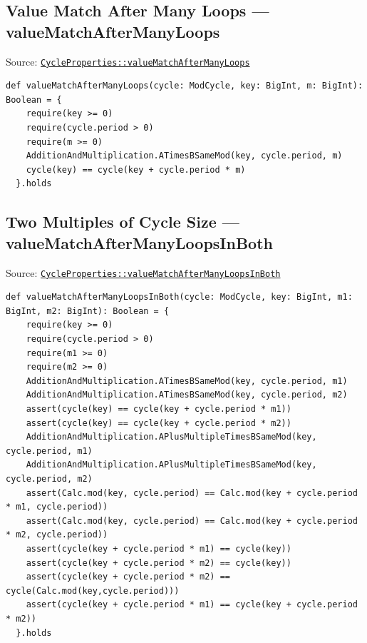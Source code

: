 \subsection{Value Match After Many Loops --- valueMatchAfterManyLoops}

Source:
\href{https://github.com/thiagomata/prime-numbers/blob/cycle-article-v1.0.0/src/main/scala/v1/chapter4/cycle/properties/CycleProperties.scala}{\texttt{CycleProperties::valueMatchAfterManyLoops}}

\begin{lstlisting}[style=scala]
  def valueMatchAfterManyLoops(cycle: ModCycle, key: BigInt, m: BigInt): Boolean = {
    require(key >= 0)
    require(cycle.period > 0)
    require(m >= 0)
    AdditionAndMultiplication.ATimesBSameMod(key, cycle.period, m)
    cycle(key) == cycle(key + cycle.period * m)
  }.holds
\end{lstlisting}

\subsection{Two Multiples of Cycle Size --- valueMatchAfterManyLoopsInBoth}

{\raggedright
Source:
\href{https://github.com/thiagomata/prime-numbers/blob/cycle-article-v1.0.0/src/main/scala/v1/chapter4/cycle/properties/CycleProperties.scala}{\texttt{CycleProperties::\allowbreak valueMatchAfterManyLoopsInBoth}}
\par}

\begin{lstlisting}[style=scala]
  def valueMatchAfterManyLoopsInBoth(cycle: ModCycle, key: BigInt, m1: BigInt, m2: BigInt): Boolean = {
    require(key >= 0)
    require(cycle.period > 0)
    require(m1 >= 0)
    require(m2 >= 0)
    AdditionAndMultiplication.ATimesBSameMod(key, cycle.period, m1)
    AdditionAndMultiplication.ATimesBSameMod(key, cycle.period, m2)
    assert(cycle(key) == cycle(key + cycle.period * m1))
    assert(cycle(key) == cycle(key + cycle.period * m2))
    AdditionAndMultiplication.APlusMultipleTimesBSameMod(key, cycle.period, m1)
    AdditionAndMultiplication.APlusMultipleTimesBSameMod(key, cycle.period, m2)
    assert(Calc.mod(key, cycle.period) == Calc.mod(key + cycle.period * m1, cycle.period))
    assert(Calc.mod(key, cycle.period) == Calc.mod(key + cycle.period * m2, cycle.period))
    assert(cycle(key + cycle.period * m1) == cycle(key))
    assert(cycle(key + cycle.period * m2) == cycle(key))
    assert(cycle(key + cycle.period * m2) == cycle(Calc.mod(key,cycle.period)))
    assert(cycle(key + cycle.period * m1) == cycle(key + cycle.period * m2))
  }.holds
\end{lstlisting}

